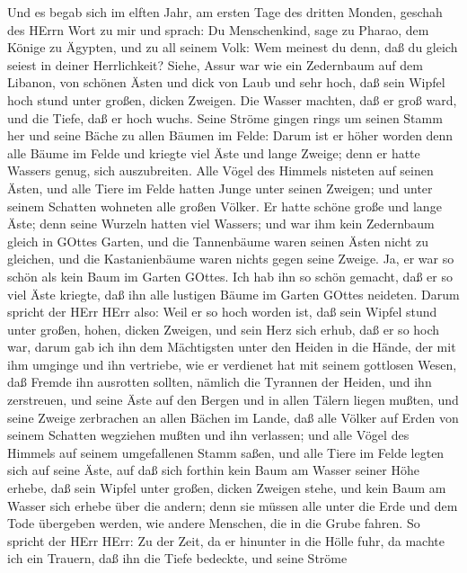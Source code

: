  Und es begab sich im elften Jahr, am ersten Tage des
dritten Monden, geschah des HErrn Wort zu mir und sprach: 
Du Menschenkind, sage zu Pharao, dem Könige zu Ägypten, und zu all
seinem Volk: Wem meinest du denn, daß du gleich seiest in deiner
Herrlichkeit?  Siehe, Assur war wie ein Zedernbaum auf dem
Libanon, von schönen Ästen und dick von Laub und sehr hoch, daß sein
Wipfel hoch stund unter großen, dicken Zweigen.  Die Wasser
machten, daß er groß ward, und die Tiefe, daß er hoch wuchs. Seine
Ströme gingen rings um seinen Stamm her und seine Bäche zu allen Bäumen
im Felde:  Darum ist er höher worden denn alle Bäume im
Felde und kriegte viel Äste und lange Zweige; denn er hatte Wassers
genug, sich auszubreiten.  Alle Vögel des Himmels nisteten
auf seinen Ästen, und alle Tiere im Felde hatten Junge unter seinen
Zweigen; und unter seinem Schatten wohneten alle großen Völker.
 Er hatte schöne große und lange Äste; denn seine Wurzeln
hatten viel Wassers;  und war ihm kein Zedernbaum gleich in
GOttes Garten, und die Tannenbäume waren seinen Ästen nicht zu gleichen,
und die Kastanienbäume waren nichts gegen seine Zweige. Ja, er war so
schön als kein Baum im Garten GOttes.  Ich hab ihn so schön
gemacht, daß er so viel Äste kriegte, daß ihn alle lustigen Bäume im
Garten GOttes neideten.  Darum spricht der HErr HErr also:
Weil er so hoch worden ist, daß sein Wipfel stund unter großen, hohen,
dicken Zweigen, und sein Herz sich erhub, daß er so hoch war,
 darum gab ich ihn dem Mächtigsten unter den Heiden in die
Hände, der mit ihm umginge und ihn vertriebe, wie er verdienet hat mit
seinem gottlosen Wesen,  daß Fremde ihn ausrotten sollten,
nämlich die Tyrannen der Heiden, und ihn zerstreuen, und seine Äste auf
den Bergen und in allen Tälern liegen mußten, und seine Zweige
zerbrachen an allen Bächen im Lande, daß alle Völker auf Erden von
seinem Schatten wegziehen mußten und ihn verlassen;  und
alle Vögel des Himmels auf seinem umgefallenen Stamm saßen, und alle
Tiere im Felde legten sich auf seine Äste,  auf daß sich
forthin kein Baum am Wasser seiner Höhe erhebe, daß sein Wipfel unter
großen, dicken Zweigen stehe, und kein Baum am Wasser sich erhebe über
die andern; denn sie müssen alle unter die Erde und dem Tode übergeben
werden, wie andere Menschen, die in die Grube fahren.  So
spricht der HErr HErr: Zu der Zeit, da er hinunter in die Hölle fuhr, da
machte ich ein Trauern, daß ihn die Tiefe bedeckte, und seine Ströme
